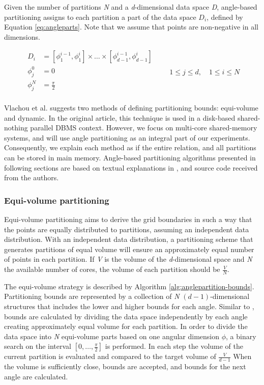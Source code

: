 \documentclass[12pt,a4paper,twoside]{report}
\begin{document}
Given the number of partitions \textit{N} and a
\textit{d}-dimensional data space \textit{D}, angle-based
partitioning assigns to each partition a part of the data space
$D_i$, defined by Equation \ref{eq:angleparts}. Note that we
assume that points are non-negative in all dimensions.

\begin{minipage}{\linewidth}
	\begin{equation}
		\label{eq:angleparts}
		\begin{aligned}
		D_i &= [\phi_1^{i-1},\phi_1^i] \times \ldots \times 
		[\phi_{d-1}^{i-1},\phi_{d-1}^i] \\
		\phi_j^0 &= 0 \\
		\phi_j^N &= \frac{\pi}{2} \\
		\end{aligned}
		\qquad 1 \leq j \leq d,\quad 1 \leq i \leq N
	\end{equation}
\end{minipage}

Vlachou et al. suggests two methods of defining partitioning bounds:
equi-volume and dynamic. In the original article, this technique is
used in a disk-based shared-nothing parallel DBMS context. However, we
focus on multi-core shared-memory systems, and will use angle
partitioning as an integral part of our experiments. Consequently, we
explain each method as if the entire relation, and all partitions can
be stored in main memory. Angle-based partitioning algorithms
presented in following sections are based on textual explanations in
\cite{vlachou2008angle}, and source code received from the authors.

\subsubsection{Equi-volume partitioning}
\label{sec:equi-volume-partitioning}

Equi-volume partitioning aims to derive the grid boundaries in
such a way that the points are equally distributed to partitions,
assuming an independent data distribution.  With an independent
data distribution, a partitioning scheme that generates partitions
of equal volume will ensure an approximately equal number of
points in each partition. If \textit{V} is the volume of the
\textit{d}-dimensional space and \textit{N} the available number
of cores, the volume of each partition should be $\frac{V}{N}$.

The equi-volume strategy is described by Algorithm
\ref{alg:anglepartition-bounds}. Partitioning bounds are
represented by a collection of \textit{N} $(d - 1)$-dimensional
structures that includes the lower and higher bounds for each
angle. Similar to \cite{vlachou2008angle}, bounds are calculated
by dividing the data space independently by each angle creating
approximately equal volume for each partition. In order to divide
the data space into \textit{N} equi-volume parts based on one
angular dimension $\phi$, a binary search on the interval $[0,
\ldots, \frac{\pi}{2}]$ is performed. In each step the volume of
the current partition is evaluated and compared to the target
volume of $\frac{V}{d-1}$ When the volume is sufficiently close,
bounds are accepted, and bounds for the next angle are calculated. 
\end{document}
